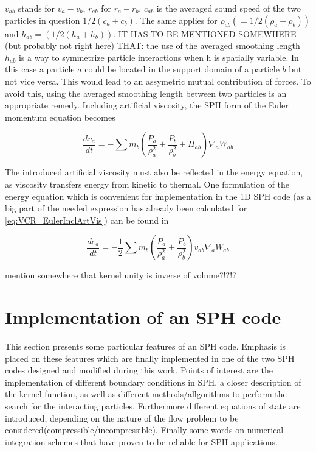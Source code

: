 \documentclass{report}
\begin{document}
$v_{ab}$ stands for $v_a-v_b$, $r_{ab}$ for $r_a-r_b$, $c_{ab}$ is the
averaged sound speed of the two particles in question $1/2(c_a+c_b)$. The same
applies for $\rho_{ab}(=1/2(\rho_a+\rho_b))$ and $h_{ab}=(1/2(h_a+h_b))$. IT
HAS TO BE MENTIONED SOMEWHERE (but probably not right here) THAT: the use of
the averaged smoothing length $h_{ab}$ is a way to symmetrize particle
interactions when h is spatially variable. In this case a particle $a$ could be
located in the support domain of a particle $b$ but not vice versa. This would
lead to an assymetric mutual contribution of forces. To avoid this, using the
averaged smoothing length between two particles is an appropriate remedy\cite{Liu2003}.
Including artificial viscosity, the SPH form of the Euler momentum equation becomes\cite{Monaghan2005}

\begin{equation}
\label{eq:VCR_EulerInclArtVis}
\frac{dv_{a}}{\mathit{dt}}=-\sum {m_{b}\left(\frac{P_{a}}{\rho_{a}^{2}}+\frac{P_{b}}{\rho _{b}^{2}}+\Pi _{ab}\right)\nabla_{a}W_{ab}}
\end{equation}

The introduced artificial viscosity must also be reflected in the energy equation, as viscosity transfers energy from kinetic to thermal\cite{Monaghan2005}. One formulation of the energy equation which is convenient for implementation in the 1D SPH code (as a big part of the needed expression has already been calculated for \ref{eq:VCR_EulerInclArtVis}) can be found in\cite{Liu2003}


\begin{equation}
\label{eq:ECR_EulerInclArtVis}
\frac{de_{a}}{\mathit{dt}}=-\mathit{}\frac{1}{2}\sum{m_{b}\left(\frac{P_{a}}{\rho _{a}^{2}}+\frac{P_{b}}{\rho _{b}^{2}}\right)v_{\mathit{ab}}\nabla _{a}W_{\mathit{ab}}}
\end{equation}


 
mention somewhere that kernel unity is inverse of volume?!?!?

\section{Implementation of an SPH code}
This section presents some particular features of an SPH code. Emphasis is
placed on these features which are finally implemented in one of the
two SPH codes designed and modified during this work.
Points of interest are the implementation of different boundary conditions in
SPH, a closer description of the kernel function, as well as different methods/allgorithms
to perform the search for the interacting particles. Furthermore different
equations of state are introduced, depending on the nature of the flow problem
to be considered(compressible/incompressible). Finally some words on numerical
integration schemes that have proven to be reliable for SPH applications.
\end{document}
